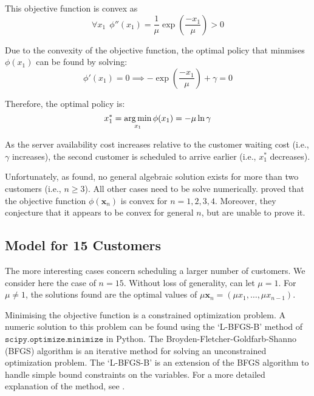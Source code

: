 This objective function is convex as
\begin{equation}
	\forall x_{1} \ \ \phi'' (x_{1}) = \frac{1}{\mu} \exp \left( \frac{- x_{1}}{\mu} \right) > 0
\end{equation}

Due to the convexity of the objective function, the optimal policy that minmises $\phi (x_{1})$ can be found by solving:
\begin{equation}
	\phi' (x_{1}) = 0 \implies - \exp \left( \frac{- x_{1}}{\mu} \right) + \gamma = 0
\end{equation}

Therefore, the optimal policy is:
\begin{equation}
	x_{1}^{*} = \operatorname*{arg\,min}_{x_{1}} \phi (x_{1}) = - \mu \ln \gamma
\end{equation}

As the server availability cost increases relative to the customer waiting cost (i.e., $\gamma$ increases), the second customer is scheduled to arrive earlier (i.e., $x_{1}^{*}$ decreases).

Unfortunately, as \citet{Pegden} found, no general algebraic solution exists for more than two customers (i.e., $n \geq 3$). All other cases need to be solve numerically. \citet{Pegden} proved that the objective function $\phi (\mathbf{x}_{n})$ is convex for $n = 1, 2, 3, 4$. Moreover, they conjecture that it appears to be convex for general $n$, but are unable to prove it.

\subsection{Model for 15 Customers}
The more interesting cases concern scheduling a larger number of customers. We consider here the case of $n = 15$. Without loss of generality, can let $\mu = 1$. For $\mu \neq 1$, the solutions found are the optimal values of $\mu \mathbf{x}_{n} = (\mu x_{1}, \ldots, \mu x_{n - 1})$.

Minimising the objective function is a constrained optimization problem. A numeric solution to this problem can be found using the `L-BFGS-B' method of \newline $\texttt{scipy.optimize.minimize}$ in Python. The Broyden-Fletcher-Goldfarb-Shanno (BFGS) algorithm is an iterative method for solving an unconstrained optimization problem. The `L-BFGS-B' is an extension of the BFGS algorithm to handle simple bound constraints on the variables. For a more detailed explanation of the method, see \citet{Byrd}.

